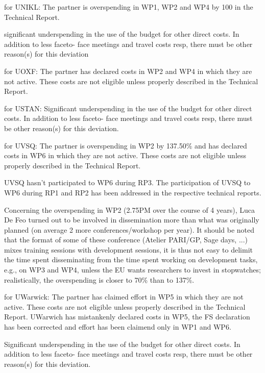 for UNIKL:
The partner is overspending in WP1, WP2 and WP4 by 100%
in the Technical Report.

significant underspending in the use of the budget for other direct costs. In addition to less faceto-
face meetings and travel costs resp, there must be other reason(s) for this deviation

for UOXF:
The partner has declared costs in WP2 and WP4 in which they are not active. These costs are
not eligible unless properly described in the Technical Report.


for USTAN:
Significant underspending in the use of the budget for other direct costs. In addition to less faceto-
face meetings and travel costs resp, there must be other reason(s) for this deviation.


for UVSQ:
The partner is overspending in WP2 by 137.50\% and has declared costs in WP6 in which they
are not active. These costs are not eligible unless properly described in the Technical Report.

UVSQ hasn't participated to WP6 during RP3. The participation of UVSQ
to WP6 during RP1 and RP2 has been addressed in the respective technical reports.

Concerning the overspending in WP2 (2.75PM over the course of 4
years), Luca De Feo turned out to be involved in dissemination more
than what was originally planned (on average 2 more
conferences/workshop per year). It should be noted that the format of
some of these conference (Atelier PARI/GP, Sage days, ...) mixes
training sessions with development sessions, it is thus not easy to
delimit the time spent disseminating from the time spent working on
development tasks, e.g., on WP3 and WP4, unless the EU wants
researchers to invest in stopwatches; realistically, the overspending
is closer to 70\% than to 137\%.

for UWarwick:
The partner has claimed effort in WP5 in which they are not active. These costs are not eligible
unless properly described in the Technical Report.
UWarwich has mistankenly declared costs in WP5, the FS declaration has been corrected and effort has been claimend only in WP1 and WP6. 

Significant underspending in the use of the budget for other direct costs. In addition to less faceto-
face meetings and travel costs resp, there must be other reason(s) for this deviation.

